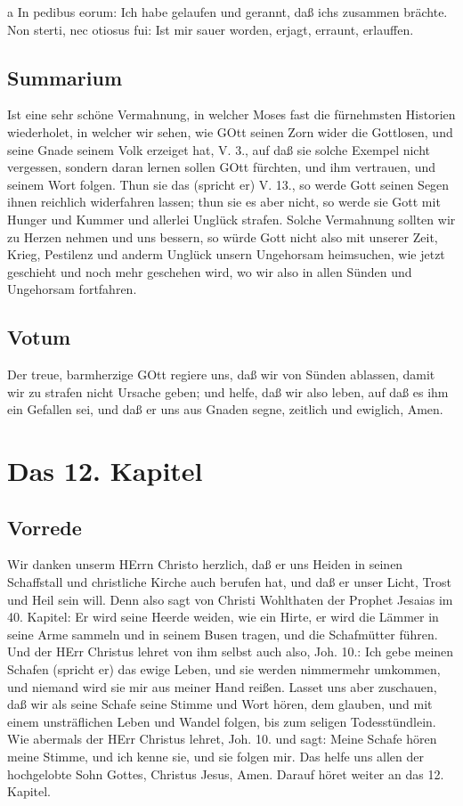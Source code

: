 a In pedibus eorum: Ich habe gelaufen und gerannt, daß ichs zusammen brächte. Non sterti, nec otiosus fui: Ist mir sauer worden, erjagt, erraunt, erlauffen.

\section{Summarium}

Ist eine sehr schöne Vermahnung, in welcher Moses fast die fürnehmsten Historien wiederholet, in welcher wir sehen, wie GOtt seinen Zorn wider die Gottlosen, und seine Gnade seinem Volk erzeiget hat, V. 3., auf daß sie solche Exempel nicht vergessen, sondern daran lernen sollen GOtt fürchten, und ihm vertrauen, und seinem Wort folgen. Thun sie das (spricht er) V. 13., so werde Gott seinen Segen ihnen reichlich widerfahren lassen; thun sie es aber nicht, so werde sie Gott mit Hunger und Kummer und allerlei Unglück strafen. Solche Vermahnung sollten wir zu Herzen nehmen und uns bessern, so würde Gott nicht also mit unserer Zeit, Krieg, Pestilenz und anderm Unglück unsern Ungehorsam heimsuchen, wie jetzt geschieht und noch mehr geschehen wird, wo wir also in allen Sünden und Ungehorsam fortfahren.

\section{Votum}

Der treue, barmherzige GOtt regiere uns, daß wir von Sünden ablassen, damit wir zu strafen nicht Ursache geben; und helfe, daß wir also leben, auf daß es ihm ein Gefallen sei, und daß er uns aus Gnaden segne, zeitlich und ewiglich, Amen.

\chapter{Das 12. Kapitel}

\section{Vorrede}

Wir danken unserm HErrn Christo herzlich, daß er uns Heiden in seinen Schaffstall und christliche Kirche auch berufen hat, und daß er unser Licht, Trost und Heil sein will. Denn also sagt von Christi Wohlthaten der Prophet Jesaias im 40. Kapitel: Er wird seine Heerde weiden, wie ein Hirte, er wird die Lämmer in seine Arme sammeln und in seinem Busen tragen, und die Schafmütter führen. Und der HErr Christus lehret von ihm selbst auch also, Joh. 10.: Ich gebe meinen Schafen (spricht er) das ewige Leben, und sie werden nimmermehr umkommen, und niemand wird sie mir aus meiner Hand reißen. Lasset uns aber zuschauen, daß wir als seine Schafe seine Stimme und Wort hören, dem glauben, und mit einem
unsträflichen Leben und Wandel folgen, bis zum seligen Todesstündlein. Wie abermals der HErr Christus lehret, Joh. 10. und sagt: Meine Schafe hören meine Stimme, und ich kenne sie, und sie folgen mir. Das helfe uns allen der hochgelobte Sohn Gottes, Christus Jesus, Amen. Darauf höret weiter an das 12. Kapitel.

